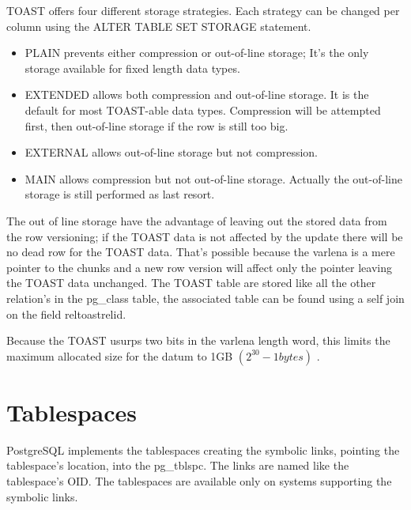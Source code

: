 TOAST offers four different storage strategies. Each strategy can be changed per column using the  
ALTER TABLE SET STORAGE statement.
\begin{itemize}
 


\item     PLAIN prevents either compression or out-of-line storage; It's the only storage available 
for fixed length data types.

\item     EXTENDED allows both compression and out-of-line storage. It is the default for most 
TOAST-able data types. Compression will be attempted first, then out-of-line storage if the row is 
still too big.

\item     EXTERNAL allows out-of-line storage but not compression. 

\item     MAIN allows compression but not out-of-line storage. Actually the out-of-line storage is 
still performed as last resort.

\end{itemize}

The out of line storage have the advantage of leaving out the 
stored data from the row versioning; if the TOAST data is not affected by the update there will be 
no dead row for the TOAST data. That's possible because the varlena is a mere pointer to the chunks 
and a new row version will affect only the pointer leaving the TOAST data unchanged.\newline
The TOAST table are stored like all the other relation's in the pg\_class table, the associated 
table can be found using a self join on the field reltoastrelid.\newline

Because the TOAST usurps two bits in the varlena length word, this limits the maximum allocated 
size 
for the datum to 1GB \begin{math} (2^{30} -1 bytes) \end{math} .

\section{Tablespaces}
\label{sub:TBS-PHYSICAL}
PostgreSQL implements the tablespaces creating the symbolic links, pointing the tablespace's 
location, into the pg\_tblspc. The links are named like the tablespace's OID. The tablespaces are 
available only on systems supporting the symbolic links.\newline

